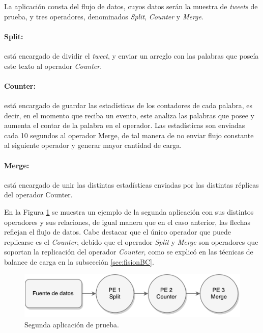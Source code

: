 La aplicación consta del flujo de datos, cuyos datos serán la muestra de \textit{tweets} de prueba, y tres operadores, denominados \textit{Split}, \textit{Counter} y \textit{Merge}.

\paragraph{Split:} está encargado de dividir el \textit{tweet}, y enviar un arreglo con las palabras que poseía este texto al operador \textit{Counter}.

\paragraph{Counter:} está encargado de guardar las estadísticas de los contadores de cada palabra, es decir, en el momento que reciba un evento, este analiza las palabras que posee y aumenta el contar de la palabra en el operador. Las estadísticas son enviadas cada 10 segundos al operador Merge, de tal manera de no enviar flujo constante al siguiente operador y generar mayor cantidad de carga.

\paragraph{Merge:} está encargado de unir las distintas estadísticas enviadas por las distintas réplicas del operador Counter.

En la Figura \ref{fig:segundaAplicacion} se muestra un ejemplo de la segunda aplicación con sus distintos operadores y sus relaciones, de igual manera que en el caso anterior, las flechas reflejan el flujo de datos. Cabe destacar que el único operador que puede replicarse es el \textit{Counter}, debido que el operador \textit{Split} y \textit{Merge} son operadores que soportan la replicación del operador \textit{Counter}, como se explicó en las técnicas de balance de carga en la subsección \ref{sec:fisionBC}.

\begin{figure}[!ht]
	\centering
		\includegraphics[scale=0.75]{images/App2.pdf}
	\caption{Segunda aplicación de prueba.}
	\label{fig:segundaAplicacion}
\end{figure}

